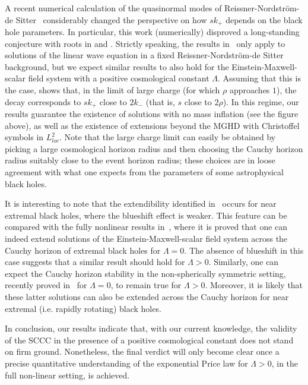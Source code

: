 \documentclass[a4paper,11pt,oneside,reqno]{amsart}
\begin{document}
A recent numerical calculation of the quasinormal modes of Reissner-Nordstr\"om-de Sitter~\cite{cardosoRNdS} considerably changed the perspective on how $sk_+$ depends on the black hole parameters. In particular, this work (numerically) disproved a long-standing conjecture with roots in \cite{Brady97} and \cite{BradyCosmic}. Strictly speaking, the results in~\cite{cardosoRNdS} only apply to solutions of the linear wave equation in a fixed Reissner-Nordstr\"om-de Sitter background, but we expect similar results to also hold for the Einstein-Maxwell-scalar field system with a positive cosmological constant $\Lambda$. Assuming that this is the case, \cite{cardosoRNdS} shows that,  in the limit of large charge (for which $\rho$ approaches $1$), the decay corresponds to $sk_+$ close to $2k_-$ (that is, $s$ close to $2\rho$). In this regime, our results guarantee the existence of solutions with no mass inflation (see the figure above), as well as the existence of extensions beyond the MGHD with Christoffel symbols in $L^2_{loc}$. Note that the large charge limit can easily be obtained by picking a large cosmological horizon radius and then choosing the Cauchy horizon radius suitably close to the event horizon radius; these choices are in loose agreement with what one expects from the parameters of some astrophysical black holes.

It is interesting to note that the extendibility identified in~\cite{cardosoRNdS} occurs for near extremal black holes, where the blueshift effect is weaker. This feature can be compared with the fully nonlinear results in~\cite{GajicLuk}, where it is proved that one can indeed extend solutions of the Einstein-Maxwell-scalar field system across the Cauchy horizon of extremal black holes for $\Lambda=0$. The absence of blueshift in this case suggests that a similar result should hold for $\Lambda>0$. Similarly, one can expect the Cauchy horizon stability in the non-spherically symmetric setting, recently proved in~\cite{DafermosLuk} for $\Lambda = 0$, to remain true for $\Lambda>0$. Moreover, it is likely that these latter solutions can also be extended across the Cauchy horizon for near extremal  (i.e. rapidly rotating) black holes.

In conclusion, our results indicate that, with our current knowledge, the validity of the SCCC in the presence of a positive cosmological constant does not stand on firm ground. Nonetheless, the final verdict will only become clear once a precise quantitative understanding of the exponential Price law for $\Lambda>0$, in the full non-linear setting,  is achieved.
\end{document}
